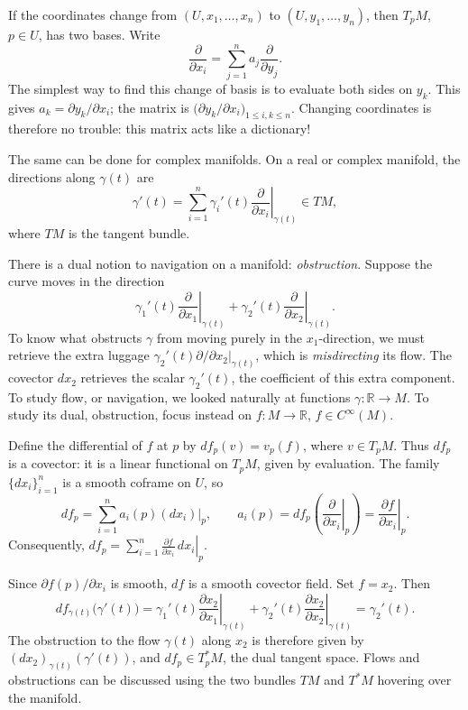 \documentclass[11pt,a4paper]{article}
\begin{document}
If the coordinates change from \((U,x_1,\ldots,x_n)\) to \((U,y_1,\ldots,y_n)\), then \(T_pM\), \(p\in U\), has two bases. Write
\[
\frac{\partial}{\partial x_i}=\sum_{j=1}^n a_j\frac{\partial}{\partial y_j}.
\]
The simplest way to find this change of basis is to evaluate both sides on \(y_k\). This gives \(a_k=\partial y_k/\partial x_i\); the matrix is
\(\bigl(\partial y_k/\partial x_i\bigr)_{1\le i,k\le n}\).
Changing coordinates is therefore no trouble: this matrix acts like a dictionary!

The same can be done for complex manifolds. On a real or complex manifold, the directions along \(\gamma(t)\) are
\[
\gamma'(t)=\sum_{i=1}^n\gamma_i'(t)
\left.\frac{\partial}{\partial x_i}\right|_{\gamma(t)}\in TM,
\]
where \(TM\) is the tangent bundle.

There is a dual notion to navigation on a manifold: \emph{obstruction}. Suppose the curve moves in the direction
\[
\gamma_1'(t)\left.\frac{\partial}{\partial x_1}\right|_{\gamma(t)}
+\gamma_2'(t)\left.\frac{\partial}{\partial x_2}\right|_{\gamma(t)}.
\]
To know what obstructs \(\gamma\) from moving purely in the \(x_1\)-direction, we must retrieve the extra luggage
\(\gamma_2'(t)\left.\partial/\partial x_2\right|_{\gamma(t)}\), which is \emph{misdirecting} its flow. The covector \(dx_2\) retrieves the scalar \(\gamma_2'(t)\), the coefficient of this extra component. To study flow, or navigation, we looked naturally at functions \(\gamma:\mathbb R\to M\). To study its dual, obstruction, focus instead on \(f:M\to\mathbb R\), \(f\in C^\infty(M)\).

Define the differential of \(f\) at \(p\) by \(df_p(v)=v_p(f)\), where \(v\in T_pM\). Thus \(df_p\) is a covector: it is a linear functional on \(T_pM\), given by evaluation. The family \(\{dx_i\}_{i=1}^n\) is a smooth coframe on \(U\), so
\[
df_p=\sum_{i=1}^n a_i(p)(dx_i)|_p,\qquad
a_i(p)=df_p\left(\left.\frac{\partial}{\partial x_i}\right|_p\right)
=\left.\frac{\partial f}{\partial x_i}\right|_p.
\]
Consequently, \(df_p=\left.\sum_{i=1}^n\frac{\partial f}{\partial x_i}\,dx_i\right|_p\).

Since \(\partial f(p)/\partial x_i\) is smooth, \(df\) is a smooth covector field. Set \(f=x_2\). Then
\[
df_{\gamma(t)}\bigl(\gamma'(t)\bigr)
=\gamma_1'(t)\left.\frac{\partial x_2}{\partial x_1}\right|_{\gamma(t)}
+\gamma_2'(t)\left.\frac{\partial x_2}{\partial x_2}\right|_{\gamma(t)}
=\gamma_2'(t).
\]
The obstruction to the flow \(\gamma(t)\) along \(x_2\) is therefore given by
\((dx_2)_{\gamma(t)}(\gamma'(t))\), and \(df_p\in T_p^*M\), the dual tangent space.
Flows and obstructions can be discussed using the two bundles \(TM\) and \(T^*M\) hovering over the manifold.
\end{document}
